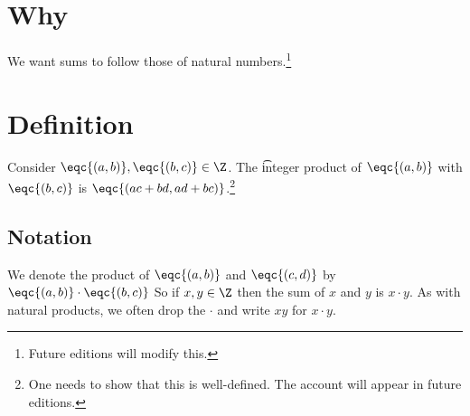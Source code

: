 

\section*{Why}

We want sums to follow those of natural numbers.\footnote{Future editions will modify this.}

\section*{Definition}

Consider $\eqc{(a, b)}, \eqc{(b, c)} \in \Z $.
The \t{integer product} of $\eqc{(a, b)}$ with $\eqc{(b, c)}$ is $\eqc{(ac + bd, ad + bc)}$.\footnote{One needs to show that this is well-defined. The account will appear in future editions.}

\subsection*{Notation}

We denote the product of $\eqc{(a, b)}$ and $\eqc{(c, d)}$ by $\eqc{(a, b)} \cdot  \eqc{(b, c)}$
So if $x, y \in \Z $ then the sum of $x$ and $y$ is $x\cdot y$.
As with natural products, we often drop the $\cdot $ and write $xy$ for $x\cdot y$.

\blankpage